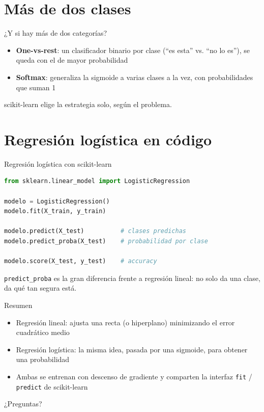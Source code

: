 \section{Más de dos clases}

\begin{frame}{¿Y si hay más de dos categorías?}
  \begin{itemize}
    \item \textbf{One-vs-rest}: un clasificador binario por clase (``es
      esta'' vs. ``no lo es''), se queda con el de mayor probabilidad
    \item \textbf{Softmax}: generaliza la sigmoide a varias clases a la
      vez, con probabilidades que suman 1
  \end{itemize}
  scikit-learn elige la estrategia solo, según el problema.
\end{frame}

\section{Regresión logística en código}

\begin{frame}[fragile]{Regresión logística con scikit-learn}
  \begin{lstlisting}[language=Python]
from sklearn.linear_model import LogisticRegression

modelo = LogisticRegression()
modelo.fit(X_train, y_train)

modelo.predict(X_test)          # clases predichas
modelo.predict_proba(X_test)    # probabilidad por clase

modelo.score(X_test, y_test)    # accuracy
  \end{lstlisting}
  \pause
  \texttt{predict\_proba} es la gran diferencia frente a regresión lineal:
  no solo da una clase, da qué tan segura está.
\end{frame}

\begin{frame}{Resumen}
  \begin{itemize}
    \item Regresión lineal: ajusta una recta (o hiperplano) minimizando el
      error cuadrático medio
    \item Regresión logística: la misma idea, pasada por una sigmoide, para
      obtener una probabilidad
    \item Ambas se entrenan con descenso de gradiente y comparten la
      interfaz \texttt{fit} / \texttt{predict} de scikit-learn
  \end{itemize}
  \vspace{1em}
  \centering
  \Large ¿Preguntas?
\end{frame}


